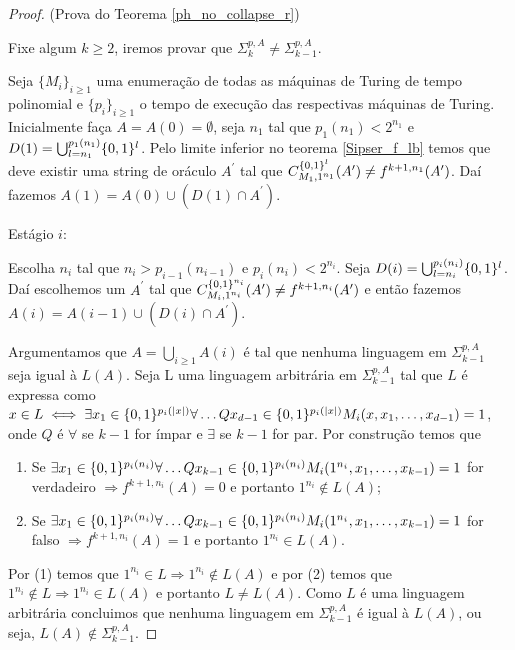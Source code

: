 \begin{proof} (Prova do Teorema \ref{ph_no_collapse_r})

Fixe algum $k \geq 2$, iremos provar que $\Sigma_{k}^{p, A} \neq \Sigma_{k - 1}^{p, A}$.

Seja $\{M_{i}\}_{i \geq 1}$ uma enumeração de todas as máquinas de Turing de tempo polinomial e $\{p_{i}\}_{i \geq 1}$ o tempo de execução das respectivas máquinas de Turing. Inicialmente faça $A = A(0) = \emptyset$, seja $n_{1}$ tal que $p_{1}(n_{1}) < 2^{n_{1}}$ e $D(1) = \bigcup_{l = n_{1}}^{p_{1}(n_{1})} \{0, 1\}^{l}$. Pelo limite inferior no teorema \ref{Sipser_f_lb} temos que deve existir uma string de oráculo $A^{\prime}$ tal que $C_{M_{1}, 1^{n_{1}}}^{\{0, 1\}^{l}}(A^{\prime}) \neq f^{k + 1, n_{1}}(A^{\prime})$. Daí fazemos $A(1) = A(0) \cup (D(1) \cap A^{\prime})$.

Estágio $i$:

Escolha $n_{i}$ tal que $n_{i} > p_{i - 1}(n_{i - 1})$ e $p_{i}(n_{i}) < 2^{n_{i}}$. Seja $D(i) = \bigcup_{l = n_{i}}^{p_{i}(n_{i})}\{0, 1\}^{l}$. Daí escolhemos um $A^{\prime}$ tal que $C_{M_{i}, 1^{n_{i}}}^{\{0, 1\}^{n_{i}}}(A^{\prime}) \neq f^{k + 1, n_{i}}(A^{\prime})$ e então fazemos $A(i) = A(i - 1) \cup (D(i) \cap A^{\prime})$.

Argumentamos que $A = \bigcup_{i \geq 1}A(i)$ é tal que nenhuma linguagem em $\Sigma_{k - 1}^{p, A}$ seja igual à $L(A)$. Seja L uma linguagem arbitrária em $\Sigma_{k - 1}^{p, A}$ tal que $L$ é expressa como $x \in L \iff \exists x_{1} \in \{0, 1\}^{p_{i}(\lvert x \rvert)}\forall \dots Q x_{d - 1 } \in \{0, 1\}^{p_{i}(\lvert x \rvert)} M_{i}(x, x_{1}, \dots, x_{d - 1}) = 1$, onde $Q$ é $\forall$ se $k - 1$ for ímpar e $\exists$ se $k - 1$ for par. Por construção temos que

\begin{enumerate}

	\item Se $\exists x_{1} \in \{0, 1\}^{p_{i}(n_{i})} \forall \dots Q x_{k - 1} \in \{0, 1\}^{p_{i}(n_{i})} M_{i}(1^{n_{i}}, x_{1}, \dots, x_{k - 1}) = 1$ for verdadeiro $\Rightarrow f^{k + 1, n_{i}}(A) = 0$ e portanto $1^{n_{i}} \not\in L(A)$;
	
	\item Se  $\exists x_{1} \in \{0, 1\}^{p_{i}(n_{i})} \forall \dots Q x_{k - 1} \in \{0, 1\}^{p_{i}(n_{i})} M_{i}(1^{n_{i}}, x_{1}, \dots, x_{k - 1}) = 1$ for falso $\Rightarrow f^{k + 1, n_{i}}(A) = 1$ e portanto $1^{n_{i}} \in L(A)$.

\end{enumerate}

Por (1) temos que $1^{n_{i}} \in L \Rightarrow 1^{n_{i}} \not\in L(A)$ e por (2) temos que $1^{n_{i}} \not\in L \Rightarrow 1^{n_{i}} \in L(A)$ e portanto $L \neq L(A)$. Como $L$ é uma linguagem arbitrária concluimos que nenhuma linguagem em $\Sigma_{k - 1}^{p, A}$ é igual à $L(A)$, ou seja, $L(A) \not\in \Sigma_{k - 1}^{p, A}$.

\end{proof}

